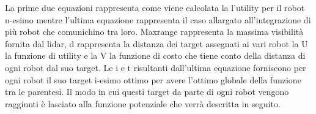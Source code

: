 La prime due equazioni rappresenta come viene calcolata la l'utility per il robot n-esimo mentre l'ultima equazione rappresenta il caso allargato all'integrazione di più robot che comunichino tra loro. Maxrange rappresenta la massima visibilità fornita dal lidar, d rappresenta la distanza dei target assegnati ai vari robot la U la funzione di utility e la V la funzione di costo che tiene conto della distanza di ogni robot dal suo target. Le i e t risultanti dall'ultima equazione forniscono per ogni robot il suo target i-esimo ottimo per avere l'ottimo globale della funzione tra le parentesi. 
Il modo in cui questi target da parte di ogni robot vengono raggiunti è lasciato alla funzione potenziale che verrà descritta in seguito.